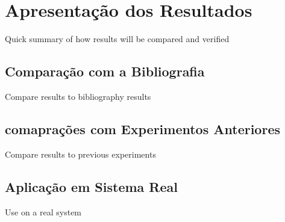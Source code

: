 \chapter{Apresentação dos Resultados}

Quick summary of how results will be compared and verified

\section{Comparação com a Bibliografia}

Compare results to bibliography results

\section{comaprações com Experimentos Anteriores}

Compare results to previous experiments

\section{Aplicação em Sistema Real}

Use on a real system
